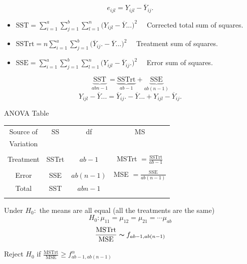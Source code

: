 \documentclass[11pt,a4paper]{article}
\theoremstyle{definition}
\begin{document}
$$e_{ijl}=Y_{ijl}-\overline{Y}_{ij}.$$

\begin{itemize}
\item[]$\text{SST}=\displaystyle{\sum^a_{i=1}\sum^b_{j=1}\sum^n_{l=1}\big(Y_{ijl}-\overline{Y}...\big)^2}\quad $ Corrected total sum of squares.
\item[]$\text{SSTrt} = \displaystyle{n\sum^a_{i=1}\sum^b_{j=1}\big(\overline{Y}_{ij}.-\overline{Y}...\big)^2}\quad $ Treatment sum of squares.
\item[]$\text{SSE} = \displaystyle{\sum^a_{i=1} \sum^b_{j=1} \sum^n_{l=1} \big(Y_{ijl}-\overline{Y}_{ij}.\big)^2}\quad $ Error sum of squares.\\
\end{itemize}


$$\underbrace{\text{SST}}_{abn-1} = \underbrace{\text{SSTrt}}_{ab-1}+\underbrace{\text{SSE}}_{ab(n-1)}$$
$$Y_{ijl}-\overline{Y}... = \overline{Y}_{ij}.-\overline{Y}...+Y_{ijl}-\overline{Y}_{ij}.$$


\begin{table}[H]
\centering
ANOVA Table\\
\begin{tabular}{|c|ccc|}
\hline
Source of & SS & df & MS\\
Variation &    &    & \\
\hline
&&&\\
Treatment & SSTrt & $ab-1$ & MSTrt $=\frac{\text{SSTrt}}{ab-1}$\\
&&&\\
Error & SSE & $ab(n-1)$ & MSE $=\frac{\text{SSE}}{ab(n-1)}$\\
\hline
Total & SST & $abn-1$ & \\
&&&\\
\hline 
\end{tabular}
\end{table}


Under $H_0:$ the means are all equal (all the treatments are the same)$$H_0:\mu_{11}=\mu_{12}=\mu_{21}=\cdots \mu_{ab}$$
$$\frac{\text{MSTrt}}{\text{MSE}}\thicksim f_{ab-1,ab(n-1)}$$

Reject $H_0$ if $\displaystyle{\frac{\text{MSTrt}}{\text{MSE}}\geq f^{\alpha}_{ab-1,ab(n-1)}}$
\end{document}
